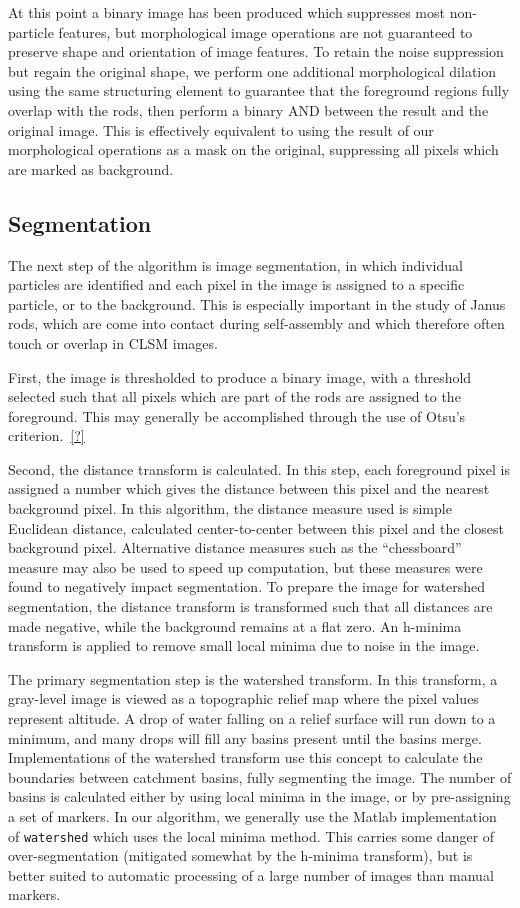 At this point a binary image has been produced which suppresses most non-particle features, but morphological
image operations are not guaranteed to preserve shape and orientation of image features.  To retain the noise suppression
but regain the original shape, we perform one additional morphological dilation using the same structuring element to
guarantee that the foreground regions fully overlap with the rods, then perform a binary AND between the result and the
original image. This is effectively equivalent to using the result of our morphological operations as a mask on
the original, suppressing
all pixels which are marked as background.

\subsection{Segmentation}

The next step of the algorithm is image segmentation, in which individual particles are identified and each pixel
in the image is assigned to a specific particle, or to the background. This is especially important in the study 
of Janus rods, which are come into contact during self-assembly and which therefore often touch or overlap in 
CLSM images. 

First, the image is thresholded to produce a binary image, with a threshold selected such that all pixels which
are part of the rods are assigned to the foreground. This may generally be accomplished through the use of 
Otsu's criterion.~\ref{?}

Second, the distance transform is calculated.  In this step, each foreground pixel is assigned a number which
gives the distance between this pixel and the nearest background pixel. In this algorithm, the distance measure used
is simple Euclidean distance, calculated center-to-center between this pixel and the closest background pixel.  Alternative
distance measures such as the ``chessboard'' measure may also be used to speed up computation, but these measures were
found to negatively impact segmentation.  To prepare the image for watershed segmentation, the distance 
transform is transformed such that all distances are made
negative, while the background remains at a flat zero. An h-minima transform is applied to remove small local minima
due to noise in the image.

The primary segmentation step is the watershed transform. In this transform, a gray-level image is viewed as
a topographic relief map where the pixel values represent altitude. A drop of water falling on a relief 
surface will run down to a minimum, and many drops will fill any basins present until the basins merge.
Implementations of the watershed transform use this concept to calculate the boundaries between catchment basins,
fully segmenting the image.  The number of basins is calculated either by using local minima in the image, or by 
pre-assigning a set of markers.  In our algorithm, we generally use the Matlab implementation of \texttt{watershed} which
uses the local minima method.  This carries some danger of over-segmentation (mitigated somewhat by the 
h-minima transform), but is better suited to automatic processing of a large number of images than manual markers.

